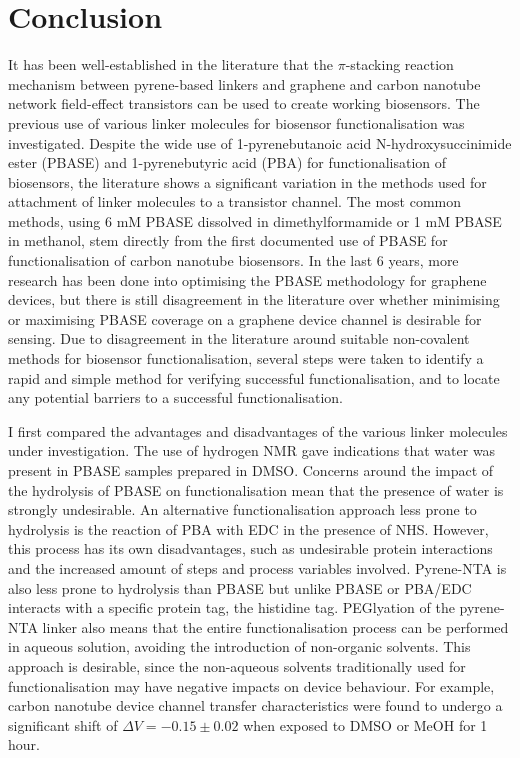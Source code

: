\documentclass[
  a4paper,
]{scrbook}
\begin{document}
\hypertarget{sec-conclusion}{%
\section{Conclusion}\label{sec-conclusion}}

It has been well-established in the literature that the \(\pi\)-stacking
reaction mechanism between pyrene-based linkers and graphene and carbon
nanotube network field-effect transistors can be used to create working
biosensors. The previous use of various linker molecules for biosensor
functionalisation was investigated. Despite the wide use of
1-pyrenebutanoic acid N-hydroxysuccinimide ester (PBASE) and
1-pyrenebutyric acid (PBA) for functionalisation of biosensors, the
literature shows a significant variation in the methods used for
attachment of linker molecules to a transistor channel. The most common
methods, using 6 mM PBASE dissolved in dimethylformamide or 1 mM PBASE
in methanol, stem directly from the first documented use of PBASE for
functionalisation of carbon nanotube biosensors. In the last 6 years,
more research has been done into optimising the PBASE methodology for
graphene devices, but there is still disagreement in the literature over
whether minimising or maximising PBASE coverage on a graphene device
channel is desirable for sensing. Due to disagreement in the literature
around suitable non-covalent methods for biosensor functionalisation,
several steps were taken to identify a rapid and simple method for
verifying successful functionalisation, and to locate any potential
barriers to a successful functionalisation.

I first compared the advantages and disadvantages of the various linker
molecules under investigation. The use of hydrogen NMR gave indications
that water was present in PBASE samples prepared in DMSO. Concerns
around the impact of the hydrolysis of PBASE on functionalisation mean
that the presence of water is strongly undesirable. An alternative
functionalisation approach less prone to hydrolysis is the reaction of
PBA with EDC in the presence of NHS. However, this process has its own
disadvantages, such as undesirable protein interactions and the
increased amount of steps and process variables involved. Pyrene-NTA is
also less prone to hydrolysis than PBASE but unlike PBASE or PBA/EDC
interacts with a specific protein tag, the histidine tag. PEGlyation of
the pyrene-NTA linker also means that the entire functionalisation
process can be performed in aqueous solution, avoiding the introduction
of non-organic solvents. This approach is desirable, since the
non-aqueous solvents traditionally used for functionalisation may have
negative impacts on device behaviour. For example, carbon nanotube
device channel transfer characteristics were found to undergo a
significant shift of \(\Delta V = -0.15 \pm 0.02\) when exposed to DMSO
or MeOH for 1 hour.
\end{document}

